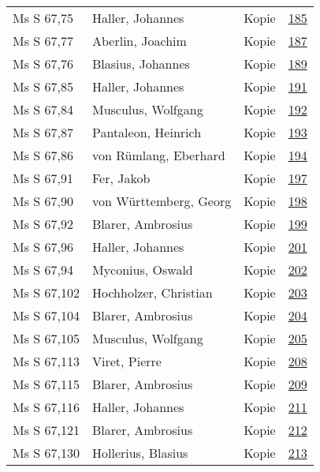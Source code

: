 \documentclass[10pt,a4paper,landscape]{report}
\begin{document}
\begin{longtable}{p{16cm}p{4cm}lr}
Ms S 67,75	&	Haller, Johannes	&	Kopie	&	\href{http://130.60.24.72/assignment/185}{185}\\
Ms S 67,77	&	Aberlin, Joachim	&	Kopie	&	\href{http://130.60.24.72/assignment/187}{187}\\
Ms S 67,76	&	Blasius, Johannes	&	Kopie	&	\href{http://130.60.24.72/assignment/189}{189}\\
Ms S 67,85	&	Haller, Johannes	&	Kopie	&	\href{http://130.60.24.72/assignment/191}{191}\\
Ms S 67,84	&	Musculus, Wolfgang	&	Kopie	&	\href{http://130.60.24.72/assignment/192}{192}\\
Ms S 67,87	&	Pantaleon, Heinrich	&	Kopie	&	\href{http://130.60.24.72/assignment/193}{193}\\
Ms S 67,86	&	von Rümlang, Eberhard	&	Kopie	&	\href{http://130.60.24.72/assignment/194}{194}\\
Ms S 67,91	&	Fer, Jakob	&	Kopie	&	\href{http://130.60.24.72/assignment/197}{197}\\
Ms S 67,90	&	von Württemberg, Georg	&	Kopie	&	\href{http://130.60.24.72/assignment/198}{198}\\
Ms S 67,92	&	Blarer, Ambrosius	&	Kopie	&	\href{http://130.60.24.72/assignment/199}{199}\\
Ms S 67,96	&	Haller, Johannes	&	Kopie	&	\href{http://130.60.24.72/assignment/201}{201}\\
Ms S 67,94	&	Myconius, Oswald	&	Kopie	&	\href{http://130.60.24.72/assignment/202}{202}\\
Ms S 67,102	&	Hochholzer, Christian	&	Kopie	&	\href{http://130.60.24.72/assignment/203}{203}\\
Ms S 67,104	&	Blarer, Ambrosius	&	Kopie	&	\href{http://130.60.24.72/assignment/204}{204}\\
Ms S 67,105	&	Musculus, Wolfgang	&	Kopie	&	\href{http://130.60.24.72/assignment/205}{205}\\
Ms S 67,113	&	Viret, Pierre	&	Kopie	&	\href{http://130.60.24.72/assignment/208}{208}\\
Ms S 67,115	&	Blarer, Ambrosius	&	Kopie	&	\href{http://130.60.24.72/assignment/209}{209}\\
Ms S 67,116	&	Haller, Johannes	&	Kopie	&	\href{http://130.60.24.72/assignment/211}{211}\\
Ms S 67,121	&	Blarer, Ambrosius	&	Kopie	&	\href{http://130.60.24.72/assignment/212}{212}\\
Ms S 67,130	&	Hollerius, Blasius	&	Kopie	&	\href{http://130.60.24.72/assignment/213}{213}\\

\end{longtable}
\end{document}

